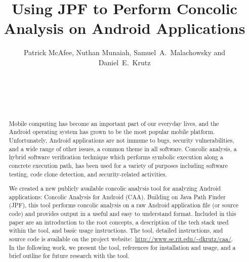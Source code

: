 \documentclass{sig-alternate-05-2015}
\begin{document}


\title{Using JPF to Perform Concolic Analysis on Android Applications}


\author{
\alignauthor
Patrick McAfee, Nuthan Munaiah, Samuel~A.~Malachowsky and Daniel~E.~Krutz\\ 	
	\\
       \\
       \\
        \\
       \alignauthor
} %

\maketitle

\begin{abstract}

Mobile computing has become an important part of our everyday lives, and the Android operating system has grown to be the most popular mobile platform. Unfortunately, Android applications are not immune to bugs, security vulnerabilities, and a wide range of other issues, a common theme in all software. Concolic analysis, a hybrid software verification technique which performs symbolic execution along a concrete execution path, has been used for a variety of purposes including software testing, code clone detection, and security-related activities.

We created a new publicly available concolic analysis tool for analyzing Android applications: Concolic Analysis for Android (CAA). Building on Java Path Finder (JPF), this tool performs concolic analysis on a raw Android application file (or source code) and provides output in a useful and easy to understand format. Included in this paper are an introduction to the root concepts, a description of the tech stack used within the tool, and basic usage instructions. The tool, detailed instructions, and source code is available on the project website:~\url{http://www.se.rit.edu/~dkrutz/caa/}. In the following work, we present the tool, references for installation and usage, and a brief outline for future research with the tool.


\end{abstract}
\end{document}
